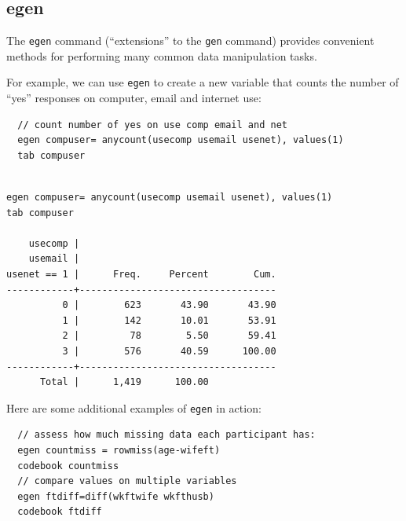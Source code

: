 \documentclass[]{book}
\begin{document}
\hypertarget{egen}{%
\subsection{egen}\label{egen}}

The \texttt{egen} command (``extensions'' to the \texttt{gen} command) provides convenient methods for performing many common data manipulation tasks.

For example, we can use \texttt{egen} to create a new variable that counts the number of ``yes'' responses on computer, email and internet use:

\begin{verbatim}
  // count number of yes on use comp email and net 
  egen compuser= anycount(usecomp usemail usenet), values(1)
  tab compuser
\end{verbatim}

\begin{verbatim}

egen compuser= anycount(usecomp usemail usenet), values(1)
tab compuser

    usecomp |
    usemail |
usenet == 1 |      Freq.     Percent        Cum.
------------+-----------------------------------
          0 |        623       43.90       43.90
          1 |        142       10.01       53.91
          2 |         78        5.50       59.41
          3 |        576       40.59      100.00
------------+-----------------------------------
      Total |      1,419      100.00
\end{verbatim}

Here are some additional examples of \texttt{egen} in action:

\begin{verbatim}
  // assess how much missing data each participant has:
  egen countmiss = rowmiss(age-wifeft)
  codebook countmiss
  // compare values on multiple variables
  egen ftdiff=diff(wkftwife wkfthusb)
  codebook ftdiff
\end{verbatim}
\end{document}
